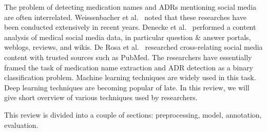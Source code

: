 The problem of detecting medication names and ADRs mentioning social media are often interrelated. Weissenbacher et al.~\cite{weissenbacher2018overview} noted that these researches have been conducted extensively in recent years. Denecke et al.~\cite{DENECKE20091870} performed a content analysis of medical social media data, in particular question \& answer portals, weblogs, reviews, and wikis. De Rosa et al.~\cite{de114pharmacovigilance} researched cross-relating social media content with trusted sources such as PubMed. The researchers have essentially framed the task of medication name extraction and ADR detection as a binary classification problem. Machine learning techniques are widely used in this task. Deep learning techniques are becoming popular of late. In this review, we will give short overview of various techniques used by researchers.

This review is divided into a couple of sections: preprocessing, model, annotation, evaluation.